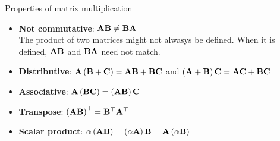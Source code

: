 \documentclass[aspectratio=169]{beamer}
\let\olditem\item
\renewcommand{\item}{\setlength{\itemsep}{\fill}\olditem}
\def\mf{\ensuremath\mathbf}
\begin{document}
\begin{frame}[t]{Properties of matrix multiplication}
\begin{itemize}
\item \textbf{Not commutative}: $\mf{A}\mf{B} \neq \mf{B}\mf{A}$\\
The product of two matrices might not alwasys be defined. When it is defined, $\mf{A}\mf{B}$ and $\mf{B}\mf{A}$ need not match.
\item \textbf{Distributive}:  $\mf{A}\left(\mf{B} + \mf{C}\right) = \mf{A}\mf{B} + \mf{B}\mf{C}$ and $\left(\mf{A} + \mf{B}\right)\mf{C} = \mf{A}\mf{C} + \mf{B}\mf{C}$ 
\item \textbf{Associative}: $\mf{A}\left(\mf{B}\mf{C}\right) = \left(\mf{A}\mf{B}\right)\mf{C} $
\item \textbf{Transpose}: $\left(\mf{A}\mf{B}\right)^{\top} = \mf{B}^{\top}\mf{A}^{\top}$
\item \textbf{Scalar product}: $\alpha\left(\mf{A}\mf{B}\right) = \left(\alpha \mf{A}\right)\mf{B} = \mf{A}\left(\alpha \mf{B}\right)$
\end{itemize}
\end{frame}
\end{document}
